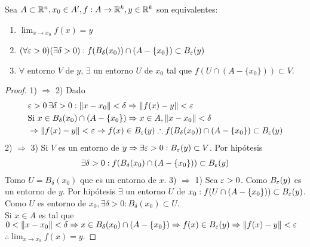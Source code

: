 \begin{prop}
  Sea \(A \subset \mathbb{R}^n, x_0 \in A^{\prime}, f: A \to \mathbb{R}^k, y \in \mathbb{R}^k\) son equivalentes:
  \begin{enumerate}
    \item \(\lim_{x \to x_0} f(x) = y\)
    \item \((\forall \varepsilon > 0)(\exists \delta > 0) : f(B_{\delta}(x_0)) \cap (A - \{x_0\}) \subset B_{\varepsilon}(y)\)
    \item \(\forall\) entorno \(V\) de \(y\), \(\exists\) un entorno \(U\) de \(x_0\) tal que \(f(U \cap (A - \{x_0\})) \subset V\).
  \end{enumerate}

  \begin{proof}
    1) \(\Rightarrow\) 2) Dado \begin{align*}
       & \varepsilon > 0 \, \exists \delta > 0 : \|x - x_0 \| < \delta \Rightarrow \|f(x) - y\| < \varepsilon                                              \\
       & \text{Si } x \in B_{\delta}(x_0) \cap (A - \{x_0\}) \Rightarrow x \in A, \|x - x_0\| < \delta                                   \\
       & \Rightarrow \|f(x) - y\| < \varepsilon \Rightarrow f(x) \in B_{\varepsilon}(y) \therefore f(B_{\delta}(x_0)) \cap (A - \{x_0\}) \subset B_{\varepsilon}(y)
    \end{align*}
    2) \(\Rightarrow\) 3) Si \(V\) es un entorno de \(y \Rightarrow \exists \varepsilon > 0 : B_{\varepsilon}(y) \subset V\). Por hipótesis \begin{align*}
      \exists \delta > 0 : f(B_{\delta}(x_0) \cap (A - \{x_0\})) \subset B_{\varepsilon}(y)
    \end{align*} Tomo \(U = B_{\delta}(x_0)\) que es un entorno de \(x\).
    3) \(\Rightarrow\) 1) Sea \(\varepsilon > 0\). Como \(B_{\varepsilon}(y)\) es un entorno de \(y\). Por hipótesis \(\exists\) un entorno \(U\) de \(x_0 : f(U \cap (A - \{x_0\})) \subset B_{\varepsilon}(y)\). Como \(U\) es entorno de \(x_0, \exists \delta > 0 : B_{\delta}(x_0) \subset U\). \\
    Si \(x \in A\) es tal que \(0 < \|x - x_0\| < \delta \Rightarrow x \in B_{\delta}(x_0) \cap (A - \{x_0\}) \Rightarrow f(x) \in B_{\varepsilon}(y) \Rightarrow \|f(x) - y\| < \varepsilon\) \\
    \(\therefore \lim_{x \to x_0} f(x) = y\).
  \end{proof}
\end{prop}

